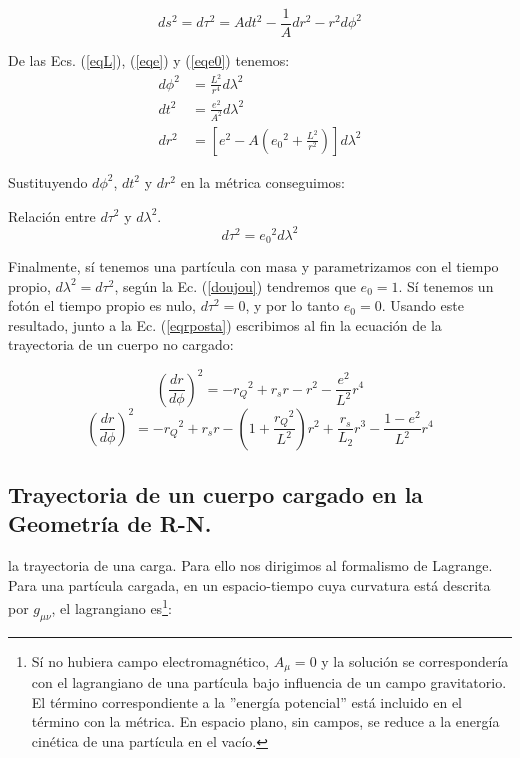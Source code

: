 \begin{equation}
    ds^2 = d\tau^2 = A dt^2 - \frac{1}{A} dr^2 - r^2 d\phi^2
\end{equation}

De las Ecs. (\ref{eqL}), (\ref{eqe}) y (\ref{eqe0}) tenemos:
\begin{equation}
\begin{split}
    d\phi^2 &= \frac{L^2}{r^4} d\lambda^2\\
    dt^2 &= \frac{e^2}{A^2} d\lambda^2\\
    dr^2 &= \left[e^2 - A\left({e_0}^2 + \frac{L^2}{r^2}\right)\right] d\lambda^2
\end{split}
\end{equation}

Sustituyendo $d\phi^2$, $dt^2$ y $dr^2$ en la métrica conseguimos:

\begin{remarkbox}{Relación entre $d\tau^2$ y $d\lambda^2$.}
\begin{equation}
    d\tau^2 = {e_0}^2 d\lambda^2
\label{doujou}
\end{equation}
\end{remarkbox}

Finalmente, sí tenemos una partícula con masa y parametrizamos con el tiempo propio, $d\lambda^2=d\tau^2$, según la Ec. (\ref{doujou}) tendremos que $e_0=1$. Sí tenemos un fotón el tiempo propio es nulo, $d\tau^2=0$, y por lo tanto $e_0=0$. Usando este resultado, junto a la Ec. (\ref{eqrposta}) escribimos al fin la ecuación de la trayectoria de un cuerpo no cargado:

\begin{equation}
    \left( \frac{dr}{d\phi} \right)^2 = -{r_Q}^2 + r_s r - r^2 - \frac{e^2}{L^2} r^4
\label{eqlightlike}
\end{equation}
\begin{equation}
    \left( \frac{dr}{d\phi} \right)^2 = -{r_Q}^2 + r_s r - \left(1 + \frac{{r_Q}^2}{L^2} \right) r^2 + \frac{r_s}{L_2} r^3 - \frac{1 - e^2}{L^2} r^4
\label{eqtimelike}
\end{equation}

\subsection*{\textbf{Trayectoria de un cuerpo cargado en la Geometría de R-N.}}
 la trayectoria de una carga. Para ello nos dirigimos al formalismo de Lagrange. Para una partícula cargada, en un espacio-tiempo cuya curvatura está descrita por $g_{\mu\nu}$, el lagrangiano es\footnote{Sí no hubiera campo electromagnético, $A_\mu=0$ y la solución se correspondería con el lagrangiano de una partícula bajo influencia de un campo gravitatorio. El término correspondiente a la ''energía potencial'' está incluido en el término con la métrica. En espacio plano, sin campos, se reduce a la energía cinética de una partícula en el vacío.}:


